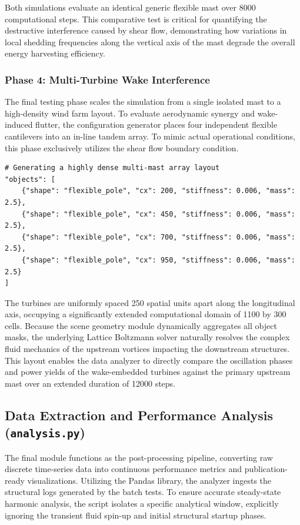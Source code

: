 \documentclass[11pt,a4paper]{article}
\begin{document}
Both simulations evaluate an identical generic flexible mast over 8000 computational steps. This comparative test is critical for quantifying the destructive interference caused by shear flow, demonstrating how variations in local shedding frequencies along the vertical axis of the mast degrade the overall energy harvesting efficiency.

\subsubsection{Phase 4: Multi-Turbine Wake Interference}
The final testing phase scales the simulation from a single isolated mast to a high-density wind farm layout. To evaluate aerodynamic synergy and wake-induced flutter, the configuration generator places four independent flexible cantilevers into an in-line tandem array. To mimic actual operational conditions, this phase exclusively utilizes the shear flow boundary condition.

\begin{lstlisting}[style=pystyle]
# Generating a highly dense multi-mast array layout
"objects": [
    {"shape": "flexible_pole", "cx": 200, "stiffness": 0.006, "mass": 2.5},
    {"shape": "flexible_pole", "cx": 450, "stiffness": 0.006, "mass": 2.5},
    {"shape": "flexible_pole", "cx": 700, "stiffness": 0.006, "mass": 2.5},
    {"shape": "flexible_pole", "cx": 950, "stiffness": 0.006, "mass": 2.5}
]
\end{lstlisting}

The turbines are uniformly spaced 250 spatial units apart along the longitudinal axis, occupying a significantly extended computational domain of 1100 by 300 cells. Because the scene geometry module dynamically aggregates all object masks, the underlying Lattice Boltzmann solver naturally resolves the complex fluid mechanics of the upstream vortices impacting the downstream structures. This layout enables the data analyzer to directly compare the oscillation phases and power yields of the wake-embedded turbines against the primary upstream mast over an extended duration of 12000 steps.

\subsection{Data Extraction and Performance Analysis (\texttt{analysis.py})}
The final module functions as the post-processing pipeline, converting raw discrete time-series data into continuous performance metrics and publication-ready visualizations. Utilizing the Pandas library, the analyzer ingests the structural logs generated by the batch tests. To ensure accurate steady-state harmonic analysis, the script isolates a specific analytical window, explicitly ignoring the transient fluid spin-up and initial structural startup phases.
\end{document}
